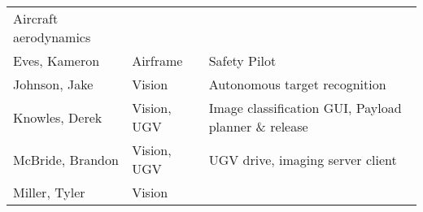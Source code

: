 \documentclass[]{auvsi_doc}
\begin{document}
\begin{longtable}[]{@{}lll@{}}
\begin{minipage}[t]{0.30\columnwidth}
{Aircraft aerodynamics}\strut
\end{minipage}\tabularnewline
\begin{minipage}[t]{0.30\columnwidth}\raggedright\strut
{Eves, Kameron}\strut
\end{minipage} & \begin{minipage}[t]{0.30\columnwidth}\raggedright\strut
{Airframe}\strut
\end{minipage} & \begin{minipage}[t]{0.30\columnwidth}\raggedright\strut
{Safety Pilot}\strut
\end{minipage}\tabularnewline
\begin{minipage}[t]{0.30\columnwidth}\raggedright\strut
{Johnson, Jake}\strut
\end{minipage} & \begin{minipage}[t]{0.30\columnwidth}\raggedright\strut
{Vision}\strut
\end{minipage} & \begin{minipage}[t]{0.30\columnwidth}\raggedright\strut
{Autonomous target recognition}\strut
\end{minipage}\tabularnewline
\begin{minipage}[t]{0.30\columnwidth}\raggedright\strut
{Knowles, Derek}\strut
\end{minipage} & \begin{minipage}[t]{0.30\columnwidth}\raggedright\strut
{Vision, UGV}\strut
\end{minipage} & \begin{minipage}[t]{0.30\columnwidth}\raggedright\strut
{Image classification GUI, Payload planner \& release}\strut
\end{minipage}\tabularnewline
\begin{minipage}[t]{0.30\columnwidth}\raggedright\strut
{McBride, Brandon}\strut
\end{minipage} & \begin{minipage}[t]{0.30\columnwidth}\raggedright\strut
{Vision, UGV}\strut
\end{minipage} & \begin{minipage}[t]{0.30\columnwidth}\raggedright\strut
{UGV drive, imaging server client}\strut
\end{minipage}\tabularnewline
\begin{minipage}[t]{0.30\columnwidth}\raggedright\strut
{Miller, Tyler}\strut
\end{minipage} & \begin{minipage}[t]{0.30\columnwidth}\raggedright\strut
{Vision}\strut
\end{minipage} & \begin{minipage}[t]{0.30\columnwidth}\raggedright\strut

\end{minipage}
\end{longtable}
\end{document}
